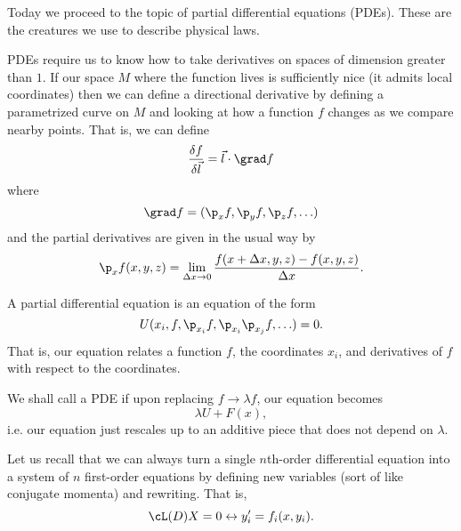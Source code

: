 Today we proceed to the topic of partial differential equations (PDEs). These are the creatures we use to describe physical laws.

PDEs require us to know how to take derivatives on spaces of dimension greater than $1$. If our space $M$ where the function lives is sufficiently nice (it admits local coordinates) then we can define a directional derivative by defining a parametrized curve on $M$ and looking at how a function $f$ changes as we compare nearby points. That is, we can define
\begin{equation}
    \frac{\delta f}{\delta \vec l} = \vec l \cdot \grad f
\end{equation}
where
\begin{equation}
    \grad f = (\p_x f, \p_y f, \p_z f,\ldots)
\end{equation}
and the partial derivatives are given in the usual way by
\begin{equation}
    \p_x f(x,y,z) = \lim_{\Delta x \to 0} \frac{f(x+\Delta x,y, z) -f(x,y,z)}{\Delta x}.
\end{equation}

\begin{defn}
    A partial differential equation is an equation of the form
    \begin{equation}
        U(x_i,f,\p_{x_i}f, \p_{x_i} \p_{x_j} f, \ldots) =0.
    \end{equation}
    That is, our equation relates a function $f$, the coordinates $x_i$, and derivatives of $f$ with respect to the coordinates.
\end{defn}

\begin{defn}
    We shall call a PDE  if upon replacing $f\to \lambda f$, our equation becomes
    \begin{equation}
        \lambda U + F(x),
    \end{equation}
    i.e. our equation just rescales up to an additive piece that does not depend on $\lambda$.
\end{defn}

Let us recall that we can always turn a single $n$th-order differential equation into a system of $n$ first-order equations by defining new variables (sort of like conjugate momenta) and rewriting. That is,
\begin{equation}
    \cL(D) X = 0 \leftrightarrow y_i' = f_i(x,y_i).
\end{equation}

